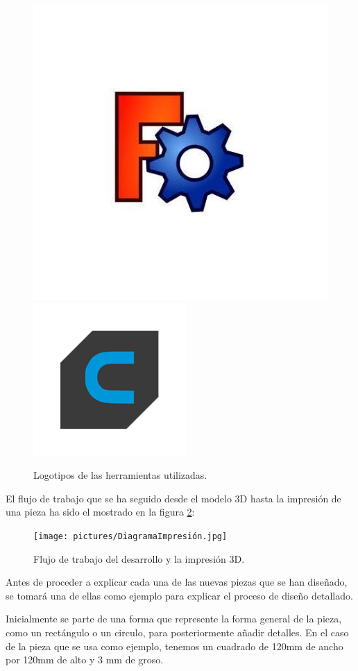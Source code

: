 \begin{figure}[H]
    \centering
    \includegraphics[width=.45\linewidth]{pictures/freeCAD.jpg}
    \hspace{1cm}
    \includegraphics[width=.40\linewidth]{pictures/Ultimaker_cura_logo.png}
    \caption{Logotipos de las herramientas utilizadas.}
    \label{fig:herramientas_3d}
\end{figure}

El flujo de trabajo que se ha seguido desde el modelo 3D hasta la impresión de una pieza ha sido el mostrado en la figura \ref{fig:flujo_3d}:

\begin{figure}[H]
    \centering
    \texttt{[image: pictures/DiagramaImpresión.jpg]}
    \caption{Flujo de trabajo del desarrollo y la impresión 3D.}
    \label{fig:flujo_3d}
\end{figure}

Antes de proceder a explicar cada una de las nuevas piezas que se han diseñado, se tomará una de ellas como ejemplo para explicar el proceso de diseño detallado.

Inicialmente se parte de una forma que represente la forma general de la pieza, como un rectángulo o un circulo, para posteriormente añadir detalles. En el caso de la pieza que se usa como ejemplo, tenemos un cuadrado de 120mm de ancho por 120mm de alto y 3 mm de groso.

